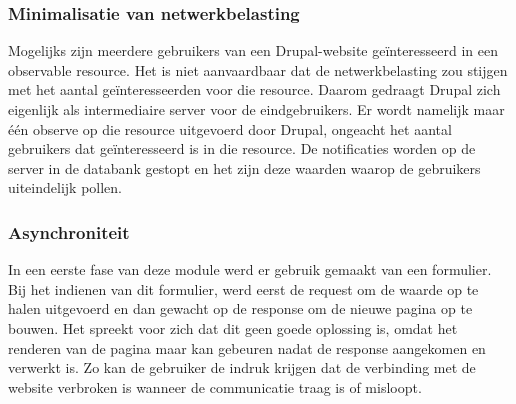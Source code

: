 \subsubsection{Minimalisatie van netwerkbelasting}
Mogelijks zijn meerdere gebruikers van een Drupal-website ge\"{i}nteresseerd in een observable resource. Het is niet aanvaardbaar dat de netwerkbelasting zou stijgen met het aantal ge\"{i}nteresseerden voor die resource. Daarom gedraagt Drupal zich eigenlijk als intermediaire server voor de eindgebruikers. Er wordt namelijk maar \'{e}\'{e}n observe op die resource uitgevoerd door Drupal, ongeacht het aantal gebruikers dat ge\"{i}nteresseerd is in die resource. De notificaties worden op de server in de databank gestopt en het zijn deze waarden waarop de gebruikers uiteindelijk pollen. %

\subsubsection{Asynchroniteit}
In een eerste fase van deze module werd er gebruik gemaakt van een formulier. Bij het indienen van dit formulier, werd eerst de request om de waarde op te halen uitgevoerd en dan gewacht op de response om de nieuwe pagina op te bouwen. Het spreekt voor zich dat dit geen goede oplossing is, omdat het renderen van de pagina maar kan gebeuren nadat de response aangekomen en verwerkt is. Zo kan de gebruiker de indruk krijgen dat de verbinding met de website verbroken is wanneer de communicatie traag is of misloopt. \\

